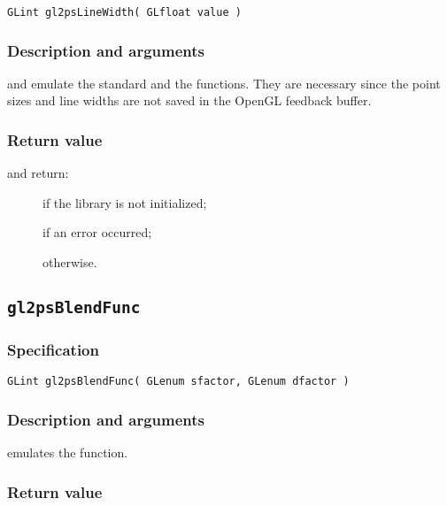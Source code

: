 \begin{verbatim}
GLint gl2psLineWidth( GLfloat value )
\end{verbatim}

\subsubsection{Description and arguments}

 and  emulate the standard
 and the  functions. They are necessary
since the point sizes and line widths are not saved in the OpenGL feedback
buffer.

\subsubsection{Return value}

\noindent{} and  return:
\begin{description}
\item[] if the library is not initialized;
\item[] if an error occurred;
\item[] otherwise.
\end{description}


\subsection{\texttt{gl2psBlendFunc}}
\label{sec:gl2psBlendFunc}

\subsubsection{Specification}

\begin{verbatim}
GLint gl2psBlendFunc( GLenum sfactor, GLenum dfactor )
\end{verbatim}

\subsubsection{Description and arguments}

 emulates the  function.

\subsubsection{Return value}


